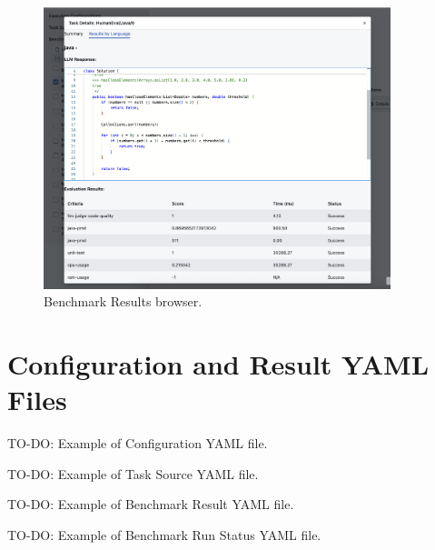 \begin{figure}[H]
    \includegraphics[width=0.9\textwidth]{./images/ui_result_single_task}
    \caption{Benchmark Results browser. }
    \label{appendix:ui_result_single_task}
\end{figure}

\chapter{Configuration and Result YAML Files}
\label{appendix:config_files}

TO-DO: Example of Configuration YAML file.

TO-DO: Example of Task Source YAML file.

TO-DO: Example of Benchmark Result YAML file.

TO-DO: Example of Benchmark Run Status YAML file.